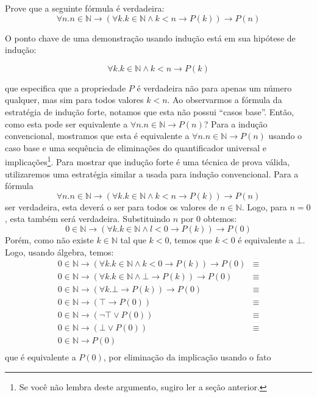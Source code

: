 \begin{ProofStrategy}
Prove que a seguinte fórmula é verdadeira:
\[
\forall n. n\in\mathbb{N} \to (\forall k. k\in\mathbb{N} \land k < n
\to P(k)) \to P(n)
\]
\end{ProofStrategy}

O ponto chave de uma demonstração usando indução está em sua hipótese
de indução:

\[\forall k. k\in\mathbb{N} \land k < n \to P(k)\]

que especifica que a propriedade $P$ é verdadeira não para apenas um
número qualquer, mas sim para todos valores $k < n$. Ao observarmos a
fórmula da estratégia de indução forte, notamos que esta não possui
``casos base''. Então, como esta pode ser equivalente a
$\forall n. n\in\mathbb{N} \to  P(n)$? Para a indução convencional,
mostramos que esta é equivalente a $\forall n. n\in\mathbb{N} \to
P(n)$ usando o caso base e uma sequência de eliminações do
quantificador universal e implicações\footnote{Se você não lembra
deste argumento, sugiro ler a seção anterior.}. Para mostrar que
indução forte é uma técnica de prova válida, utilizaremos uma
estratégia similar a usada para indução convencional. Para a fórmula
\[
\forall n. n\in\mathbb{N} \to (\forall k. k\in\mathbb{N} \land k < n
\to P(k)) \to P(n)
\]
ser verdadeira, esta deverá o ser para todos os valores de $n
\in\mathbb{N}$. Logo, para $n = 0$, esta também será
verdadeira. Substituindo $n$ por $0$ obtemos:
\[
0\in\mathbb{N}\to (\forall k. k\in \mathbb{N} \land l < 0 \to P(k))
\to P(0)
\]
Porém, como não existe $k \in \mathbb{N}$ tal que $k < 0$, temos que
$k< 0$ é equivalente a $\bot$. Logo, usando álgebra, temos:
\[
\begin{array}{lc}
0\in\mathbb{N}\to (\forall k. k\in \mathbb{N} \land k < 0 \to P(k))
\to P(0) & \equiv \\
0 \in \mathbb{N} \to (\forall k. k\in\mathbb{N} \land \bot \to
P(k))\to P(0) & \equiv \\
0 \in\mathbb{N} \to (\forall k. \bot \to P(k))\to P(0) & \equiv \\
0 \in\mathbb{N} \to (\top \to P(0)) & \equiv \\
0 \in \mathbb{N} \to (\neg \top \lor P(0)) & \equiv \\
0 \in \mathbb{N} \to (\bot \lor P(0)) & \equiv \\
0 \in \mathbb{N} \to P(0) &  \\
\end{array}
\]
que é equivalente a $P(0)$, por eliminação da implicação usando o fato
